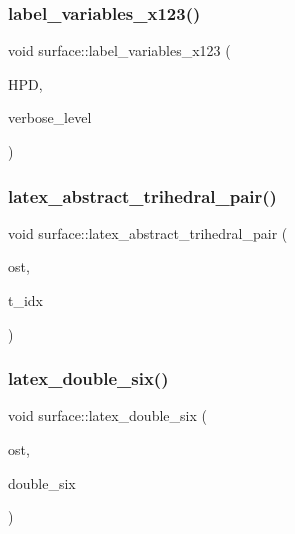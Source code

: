 \mbox{\label{classsurface_a65aacff743fcb36c0457fc936edfabd2}} 
\subsubsection{\texorpdfstring{label\+\_\+variables\+\_\+x123()}{label\_variables\_x123()}}
{\footnotesize\ttfamily void surface\+::label\+\_\+variables\+\_\+x123 (\begin{DoxyParamCaption}\item[{\mbox{\hyperlink{classhomogeneous__polynomial__domain}{homogeneous\+\_\+polynomial\+\_\+domain}} $\ast$}]{H\+PD,  }\item[{\mbox{\hyperlink{galois_8h_a09fddde158a3a20bd2dcadb609de11dc}{I\+NT}}}]{verbose\+\_\+level }\end{DoxyParamCaption})}

\mbox{\label{classsurface_a67161b031df3fdd60989e73ec3a9213e}} 
\subsubsection{\texorpdfstring{latex\+\_\+abstract\+\_\+trihedral\+\_\+pair()}{latex\_abstract\_trihedral\_pair()}}
{\footnotesize\ttfamily void surface\+::latex\+\_\+abstract\+\_\+trihedral\+\_\+pair (\begin{DoxyParamCaption}\item[{ostream \&}]{ost,  }\item[{\mbox{\hyperlink{galois_8h_a09fddde158a3a20bd2dcadb609de11dc}{I\+NT}}}]{t\+\_\+idx }\end{DoxyParamCaption})}

\mbox{\label{classsurface_a76d9d68a0475c09538a68ce7acf9cdf9}} 
\subsubsection{\texorpdfstring{latex\+\_\+double\+\_\+six()}{latex\_double\_six()}}
{\footnotesize\ttfamily void surface\+::latex\+\_\+double\+\_\+six (\begin{DoxyParamCaption}\item[{ostream \&}]{ost,  }\item[{\mbox{\hyperlink{galois_8h_a09fddde158a3a20bd2dcadb609de11dc}{I\+NT}} $\ast$}]{double\+\_\+six }\end{DoxyParamCaption})}

